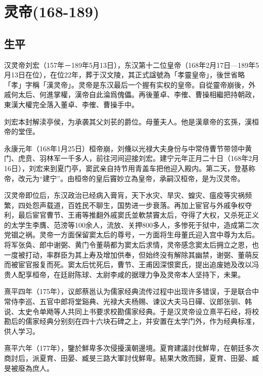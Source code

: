 
\section{灵帝\tiny(168-189)}

\subsection{生平}

汉灵帝刘宏（157年－189年5月13日），东汉第十二位皇帝（168年2月17日—189年5月13日在位），在位22年，葬于汉文陵，其正式諡號為「孝靈皇帝」，後世省略「孝」字稱「漢灵帝」。灵帝是东汉最后一个握有实权的皇帝。自從靈帝崩後，外戚何太后、何進掌權，漢帝自此淪爲傀儡。再後董卓、李傕、曹操相繼把持朝政，東漢大權完全落入董卓、李傕、曹操手中。

刘宏本封解渎亭侯，为承袭其父刘苌的爵位。母董夫人。他是漢章帝的玄孫，漢桓帝的堂侄。

永康元年（168年1月25日）桓帝崩，刘儵以光禄大夫身份与中常侍曹节带领中黄门、虎贲、羽林军一千多人，前往河间迎接刘宏。建宁元年正月二十日（168年2月16日），刘宏来到夏门亭，窦武亲自持节用青盖车把他迎入殿内。第二天，登基称帝，改元为“建宁”。由桓帝的皇后竇妙立為皇帝，承嗣汉桓帝，是为汉灵帝。　

汉灵帝即位后，东汉政治已经病入膏肓，天下水灾、旱灾、蝗灾、瘟疫等灾祸频繁，四处怨声载道，百姓民不聊生，国势进一步衰落。再加上宦官与外戚争权夺利，最后宦官曹节、王甫等推翻外戚窦氏並軟禁竇太后，夺得了大权，又杀死正义的太学生李膺、范滂等100余人，流放、关押800多人，多惨死于狱中，造成第二次党锢之祸。灵帝一方面保留窦太后的尊号，一方面将生母董氏迎入宫中尊为太后。将军张奂、郎中谢弼、黄门令董萌都为窦太后求情，灵帝感念窦太后拥立之恩，也一度被打动，率群臣为其上寿及增加供奉，但始终没有解除其幽禁，谢弼、董萌反而被宦官报复而死。窦太后忧死后，曹节、王甫因深恨窦氏，提出追废她及改以冯贵人配享桓帝，在廷尉陈球、太尉李咸的据理力争及灵帝本人坚持下，未果。

熹平四年（175年），议郎蔡邕认为儒家经典流传过程中出现许多错误，于是联合中常侍李巡、五官中郎将堂谿典、光禄大夫杨赐、谏议大夫马日磾、议郎张驯、韩说、太史令单飏等人共同上书要求校勘儒家经典。于是汉灵帝设立熹平石经，将校勘后的儒家经典分别刻在四十六块石碑之上，并安置在太学门外，作为经典标准，供人学习。

熹平六年（177年），鑒於鮮卑多次侵擾漢朝邊境。夏育建議討伐鮮卑，在朝廷多次商討后，派夏育、田晏、臧旻三路大軍討伐鮮卑。結果大敗而歸，夏育、田晏、臧旻被廢為庶人。

